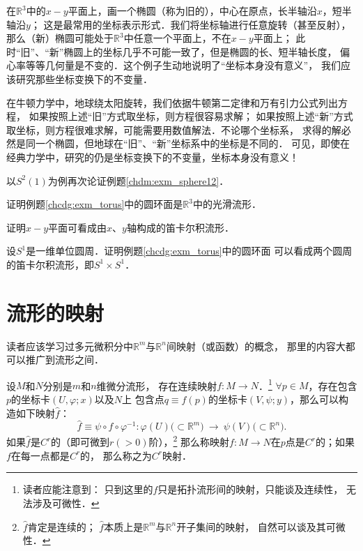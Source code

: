 \begin{example}\label{chdm:exam_tuoyuan}
    在$\mathbb{R}^3$中的$x-y$平面上，画一个椭圆（称为旧的），中心在原点，长半轴沿$x$，短半轴沿$y$；
    这是最常用的坐标表示形式．我们将坐标轴进行任意旋转（甚至反射），
    那么（新）椭圆可能处于$\mathbb{R}^3$中任意一个平面上，不在$x-y$平面上；
    此时“旧”、“新”椭圆上的坐标几乎不可能一致了，但是椭圆的长、短半轴长度，
    偏心率等等几何量是不变的．这个例子生动地说明了“坐标本身没有意义”，
    我们应该研究那些坐标变换下的不变量．
    
    在牛顿力学中，地球绕太阳旋转，我们依据牛顿第二定律和万有引力公式列出方程，
    如果按照上述“旧”方式取坐标，则方程很容易求解；
    如果按照上述“新”方式取坐标，则方程很难求解，可能需要用数值解法．不论哪个坐标系，
    求得的解必然是同一个椭圆，但地球在“旧”、“新”坐标系中的坐标是不同的．
    可见，即使在经典力学中，研究的仍是坐标变换下的不变量，坐标本身没有意义！
\end{example}



\begin{exercise}
	以$S^2(1)$为例再次论证例题\ref{chdm:exm_sphere12}．
\end{exercise}

\begin{exercise}
	证明例题\ref{chcdg:exm_torus}中的圆环面是$\mathbb{R}^3$中的光滑流形．
\end{exercise}

\begin{exercise}
	证明$x-y$平面可看成由$x$、$y$轴构成的笛卡尔积流形．
\end{exercise}


\begin{exercise}
	设$S^1$是一维单位圆周．证明例题\ref{chcdg:exm_torus}中的圆环面
	可以看成两个圆周的笛卡尔积流形，即$S^1\times S^1$．
\end{exercise}


\section{流形的映射}\label{chdm:sec_map-dm}
读者应该学习过多元微积分中$\mathbb{R}^m$与$\mathbb{R}^n$间映射（或函数）的概念，
那里的内容大都可以推广到流形之间．
\begin{definition}\label{chdm:def_fmapMN}
    设$M$和$N$分别是$m$和$n$维微分流形，
    存在连续映射$f:M\to N$．{\footnote{读者应能注意到：
            只到这里的$f$只是拓扑流形间的映射，只能谈及连续性，
            无法涉及可微性．}}
    $\forall p\in M$，存在包含$p$的坐标卡$(U,\varphi;x)$以及$N$上
    包含点$q\equiv f(p)$的坐标卡$(V,\psi;y)$，那么可以构造如下映射$\hat{f}$：
    \begin{equation*}
        \hat{f}\equiv \psi \circ f \circ \varphi^{-1} :
        \varphi(U) \bigl(\subset \mathbb{R}^m\bigr) \ \to \ 
        \psi(V) \bigl(\subset \mathbb{R}^n\bigr) .
    \end{equation*}
    如果$\hat{f}$是$C^r$的（即可微到$r(>0)$阶），{\footnote{$\hat{f}$肯定是连续的；
            $\hat{f}$本质上是$\mathbb{R}^m$与$\mathbb{R}^n$开子集间的映射，
            自然可以谈及其可微性．}}
    那么称映射$f:M\to N$在$p$点是$C^r$的；如果$f$在每一点都是$C^r$的，
    那么称之为$C^r$映射．
\end{definition}

